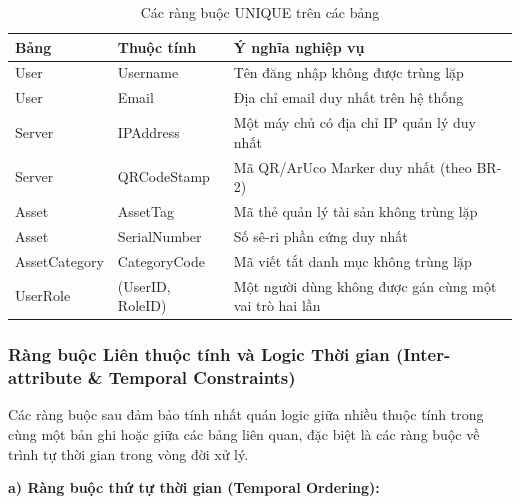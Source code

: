 \begin{table}[H]
\centering
\caption{Các ràng buộc UNIQUE trên các bảng}
\label{tab:unique_constraints}
\begin{tabular}{|l|l|p{6.5cm}|}
\hline
\textbf{Bảng} & \textbf{Thuộc tính} & \textbf{Ý nghĩa nghiệp vụ} \\ \hline
User & Username & Tên đăng nhập không được trùng lặp \\ \hline
User & Email & Địa chỉ email duy nhất trên hệ thống \\ \hline
Server & IPAddress & Một máy chủ có địa chỉ IP quản lý duy nhất \\ \hline
Server & QRCodeStamp & Mã QR/ArUco Marker duy nhất (theo BR-2) \\ \hline
Asset & AssetTag & Mã thẻ quản lý tài sản không trùng lặp \\ \hline
Asset & SerialNumber & Số sê-ri phần cứng duy nhất \\ \hline
AssetCategory & CategoryCode & Mã viết tắt danh mục không trùng lặp \\ \hline
UserRole & (UserID, RoleID) & Một người dùng không được gán cùng một vai trò hai lần \\ \hline
\end{tabular}
\end{table}

\subsubsection{Ràng buộc Liên thuộc tính và Logic Thời gian (Inter-attribute \& Temporal Constraints)}

Các ràng buộc sau đảm bảo tính nhất quán logic giữa nhiều thuộc tính trong cùng một bản ghi hoặc giữa các bảng liên quan, đặc biệt là các ràng buộc về trình tự thời gian trong vòng đời xử lý.

\vspace{0.5em}
\noindent\textbf{a) Ràng buộc thứ tự thời gian (Temporal Ordering):}

